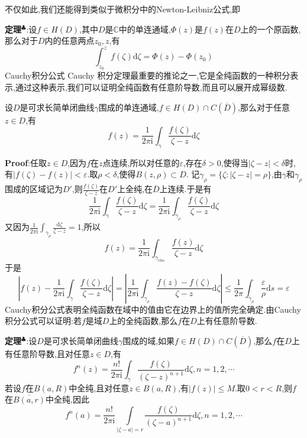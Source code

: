 不仅如此,我们还能得到类似于微积分中的Newton-Leibniz公式,即\par
\textbf{定理}$^\clubsuit$:设$f\in H(D)$,其中$D$是$\mathbb{C}$中的单连通域,$\varPhi (z)$是$f(z)$在$D$上的一个原函数,那么对于$D$内的任意两点$z_0,z$,有
$$
\int_{z_0}^zf(\zeta)\mathrm{d}\zeta=\varPhi (z)-\varPhi (z_0)
$$
\quad \quad Cauchy积分公式 Cauchy 积分定理最重要的推论之一,它是全纯函数的一种积分表示,通过这种表示,我们可以证明全纯函数有任意阶导数,而且可以展开成幂级数.
\begin{tcolorbox}[colback=KuangNei,colframe=BianKuang,title=\textbf{Cauchy积分公式},sharpish corners]
    设$D$是可求长简单闭曲线$\gamma$围成的单连通域,$f\in H(D)\cap C(\overline{D})$,那么对于任意$z\in D$,有
    $$
    f(z)=\frac{1}{2\pi\mathrm{i}}\int_{\gamma}\frac{f(\zeta)}{\zeta-z}\mathrm{d}\zeta
    $$
\end{tcolorbox}
\textbf{Proof}:任取$z\in D$,因为$f$在$z$点连续,所以对任意的$\varepsilon$,存在$\delta>0$,使得当$|\zeta-z|<\delta$时,有$|f(\zeta)-f(z)|<\varepsilon$.取$\rho <\delta$,使得$B(z,\rho)\subset D$.
记$\gamma_{\rho}=\{\zeta:|\zeta-z|=\rho\}$,由$\gamma $和$\gamma_{\rho}$围成的区域记为$D'$,则$\frac{f(\zeta)}{\zeta-z}$在$D'$上全纯,在$\overline{D}$上连续.于是有
$$
\frac{1}{2\pi\mathrm{i}}\int_{\gamma}\frac{f(\zeta)}{\zeta-z}\mathrm{d}\zeta=\frac{1}{2\pi\mathrm{i}}\int_{\gamma_{\rho}}\frac{f(\zeta)}{\zeta-z}\mathrm{d}\zeta
$$
又因为$\frac{1}{2\pi\mathrm{i}}\int_{\gamma_{\rho}}\frac{\mathrm{d}\zeta}{\zeta-z}=1$,所以
$$
f(z)=\frac{1}{2\pi\mathrm{i}}\int_{\gamma_{rho}}\frac{f(z)}{\zeta-z}\mathrm{d}\zeta
$$
于是
$$
\left\lvert f(z)-\frac{1}{2\pi\mathrm{i}}\int_{\gamma}\frac{f(\zeta)}{\zeta-z}\mathrm{d}\zeta \right\rvert =\left\rvert \frac{1}{2\pi\mathrm{i}}\int_{\gamma_{\rho}}\frac{f(z)-f(\zeta)}{\zeta-z}\mathrm{d}\zeta\right\rvert \leqslant \frac{1}{2\pi}\int_{\gamma_{\rho}}\frac{\varepsilon}{\rho}\mathrm{d}s=\varepsilon
$$
\quad \quad Cauchy积分公式表明全纯函数在域中的值由它在边界上的值所完全确定.由Cauchy积分公式可以证明:若$f$是域$D$上的全纯函数,那么$f$在$D$上有任意阶导数.\par
\textbf{定理}$^\clubsuit$:设$D$是可求长简单闭曲线$\gamma$围成的域,如果$f\in H(D)\cap C(\overline{D})$,那么$f$在$D$上有任意阶导数,且对任意$z\in D$,有
$$
f^{n}(z)=\frac{n!}{2\pi\mathrm{i}}\int_{\gamma}\frac{f(\zeta)}{(\zeta-z)^{n+1}}\mathrm{d}\zeta,n=1,2,\cdots
$$
\quad \quad 若设$f$在$B(a,R)$中全纯,且对任意$z\in B(a,R)$,有$|f(z)|\leqslant M$.取$0<r<R$,则$f$在$\overline{B(a,r)}$中全纯,因此
$$
f^{n}(a)=\frac{n!}{2\pi\mathrm{i}}\int\limits_{|\zeta-a|=r}\frac{f(\zeta)}{(\zeta-a)^{n+1}}\mathrm{d}\zeta,n=1,2,\cdots
$$
